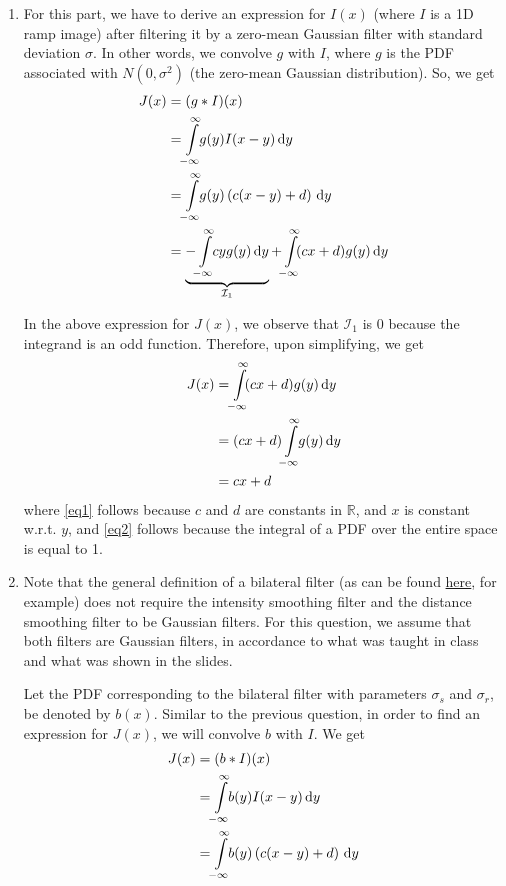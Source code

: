 \documentclass[a4paper]{article}
\newcommand{\R}{\mathbb{R}}
\begin{document}
\begin{enumerate}
\item For this part, we have to derive an expression for $I(x)$ (where $I$ is a 1D ramp image) after filtering it by a zero-mean Gaussian filter with standard deviation $\sigma$. In other words, we convolve $g$ with $I$, where $g$ is the PDF associated with $N(0, \sigma^2)$ (the zero-mean Gaussian distribution). So, we get
\begin{align*}
J(x) &= (g * I)(x) \\
&= \int\limits_{\mathclap{-\infty}}^{\mathclap{\infty}}\! g(y) I (x - y)\, \mathrm{d}y \\
&= \int\limits_{\mathclap{-\infty}}^{\mathclap{\infty}}\! g(y)\left ( c(x - y) + d\right )\, \mathrm{d}y \\
&= \underbrace{-\int\limits_{\mathclap{-\infty}}^{\mathclap{\infty}}\! c y g(y)\, \mathrm{d}y}_{\mathcal{I}_1} + \int\limits_{\mathclap{-\infty}}^{\mathclap{\infty}}\! (cx + d)g(y)\, \mathrm{d}y
\end{align*}

In the above expression for $J(x)$, we observe that $\mathcal{I}_1$ is 0 because the integrand is an odd function. Therefore, upon simplifying, we get
\begin{align}
J(x) &= \int\limits_{\mathclap{-\infty}}^{\mathclap{\infty}}\! (cx + d)g(y)\, \mathrm{d}y \nonumber \\
&=  (cx + d)\int\limits_{\mathclap{-\infty}}^{\mathclap{\infty}}\!g(y)\, \mathrm{d}y \label{eq1} \\
&= cx + d \label{eq2}
\end{align}
where \eqref{eq1} follows because $c$ and $d$ are constants in $\R$, and $x$ is constant w.r.t. $y$, and \eqref{eq2} follows because the integral of a PDF over the entire space is equal to 1.

\item Note that the general definition of a bilateral filter (as can be found \href{https://en.wikipedia.org/wiki/Bilateral_filter#Definition}{here}, for example) does not require the intensity smoothing filter and the distance smoothing filter to be Gaussian filters. For this question, we assume that both filters are Gaussian filters, in accordance to what was taught in class and what was shown in the slides.

Let the PDF corresponding to the bilateral filter with parameters $\sigma_s$ and $\sigma_r$, be denoted by $b(x)$. Similar to the previous question, in order to find an expression for $J(x)$, we will convolve $b$ with $I$. We get
\begin{align*}
J(x) &= (b * I)(x) \\
&= \int\limits_{\mathclap{-\infty}}^{\mathclap{\infty}}\! b(y) I (x - y)\, \mathrm{d}y \\
&= \int\limits_{\mathclap{-\infty}}^{\mathclap{\infty}}\! b(y)\left ( c(x - y) + d\right )\, \mathrm{d}y
\end{align*}


\end{enumerate}
\end{document}

